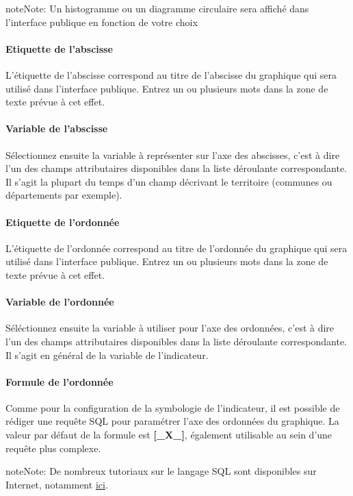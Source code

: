 \documentclass[letterpaper,10pt,french]{sphinxmanual}
\begin{document}
\begin{notice}{note}{Note:}
Un histogramme ou un diagramme circulaire sera affiché dans l'interface publique en fonction de votre choix
\end{notice}
\paragraph{Etiquette de l'abscisse}

L'étiquette de l'abscisse correspond au titre de l'abscisse du graphique qui sera utilisé dans l'interface publique. Entrez un ou plusieurs mots dans la zone de texte prévue à cet effet.
\paragraph{Variable de l'abscisse}

Sélectionnez ensuite la variable à représenter sur l'axe des abscisses, c'est à dire l'un des champs attributaires disponibles dans la liste déroulante correspondante. Il s'agit la plupart du temps d'un champ décrivant le territoire (communes ou départements par exemple).
\paragraph{Etiquette de l'ordonnée}

L'étiquette de l'ordonnée correspond au titre de l'ordonnée du graphique qui sera utilisé dans l'interface publique. Entrez un ou plusieurs mots dans la zone de texte prévue à cet effet.
\paragraph{Variable de l'ordonnée}

Séléctionnez ensuite la variable à utiliser pour l'axe des ordonnées, c'est à dire l'un des champs attributaires disponibles dans la liste déroulante correspondante. Il s'agit en général de la variable de l'indicateur.
\paragraph{Formule de l'ordonnée}

Comme pour la configuration de la symbologie de l'indicateur, il est possible de rédiger une requête SQL pour paramétrer l'axe des ordonnées du graphique. La valeur par défaut de la formule est \textbf{{[}\_X\_{]}}, également utilisable au sein d'une requête plus complexe.

\begin{notice}{note}{Note:}
De nombreux tutoriaux sur le langage SQL sont disponibles sur Internet, notamment \href{http://sql.developpez.com/}{ici}.
\end{notice}
\end{document}
